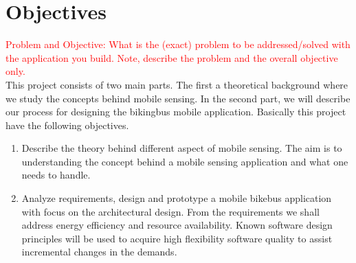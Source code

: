 \section{Objectives}
\textcolor{red}{Problem and Objective: What is the (exact) problem to be addressed/solved with the application you build. Note, describe the problem and the overall objective only.}\\


\iffalse
\noindent
What we should address:
\begin{enumerate}
    \item  Analyze architectural structures and qualities of a mobile system and provide arguments for what needs to be done to evolve the architecture according to new and changing requirements
            
    \item  Explain the code base in a larger mobile system and explain how incremental expansions of functionality can be made according to changing requirements
    
    \item   Provide arguments for the choice of technologies in a given mobile system project taking into account the architectural and project requirements
    
    \item Provide arguments for how to architect mobile system solutions that address energy efficiency and resource availability challenges. 
\end{enumerate}
\fi

This project consists of two main parts. The first a theoretical background where we study the concepts behind mobile sensing. In the second part, we will describe our process for designing the bikingbus mobile application. Basically this project have the following objectives. 

\begin{enumerate}
    \item   Describe the theory behind different aspect of mobile sensing. The aim is to understanding the concept behind a mobile sensing application and what one needs to handle. 
            
    \item  Analyze requirements, design and prototype a mobile bikebus application with focus on the architectural design. From the requirements we shall address energy efficiency and resource availability. Known software design principles will be used to acquire high flexibility software quality to assist incremental changes in the demands. 

\end{enumerate}


